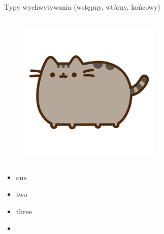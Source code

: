 \begin{columnframe}{Typy wychwytywania (wstępny, wtórny, końcowy)}
    \begin{column}{0.5\textwidth}
        \begin{figure}
            \centering
            \includegraphics[width=0.6\textwidth, frame]{images/pusheen.png}
        \end{figure}
    \end{column}
    \begin{column}{0.5\textwidth}
        \begin{itemize}
            \item one \keV
            \item two \MeV
            \item three \GeV
            \item \aegis
        \end{itemize}
    \end{column}
\end{columnframe}

